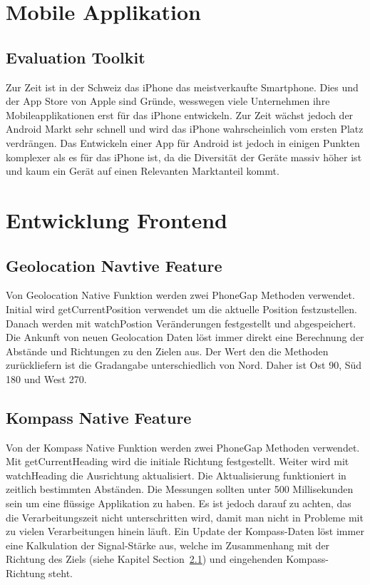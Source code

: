 
\newpage
\section{Mobile Applikation} %
\label{sec:Mobile Applikation}

\subsection{Evaluation Toolkit} %
\label{sub:Evaluation Toolkit}
Zur Zeit ist in der Schweiz das iPhone das meistverkaufte Smartphone. Dies und der App Store von Apple sind Gründe, wesswegen viele Unternehmen ihre Mobileapplikationen erst für das iPhone entwickeln. Zur Zeit wächst jedoch der Android Markt sehr schnell und wird das iPhone wahrscheinlich vom ersten Platz verdrängen. Das Entwickeln einer App für Android ist jedoch in einigen Punkten komplexer als es für das iPhone ist, da die Diversität der Geräte massiv höher ist und kaum ein Gerät auf einen Relevanten Marktanteil kommt.

\section{Entwicklung Frontend} %
\label{sec:entwicklung_frontend}

\subsection{Geolocation Navtive Feature} %
\label{sub:geolocation_native_feature}
Von Geolocation Native Funktion werden zwei PhoneGap Methoden verwendet. Initial wird getCurrentPosition verwendet um die aktuelle Position festzustellen. Danach werden mit watchPostion Veränderungen festgestellt und abgespeichert. Die Ankunft von neuen Geolocation Daten löst immer direkt eine Berechnung der Abstände und Richtungen zu den Zielen aus. Der Wert den die Methoden zurückliefern ist die Gradangabe unterschiedlich von Nord. Daher ist Ost 90, Süd 180 und West 270.

\subsection{Kompass Native Feature} %
\label{sub:kompass_native_feature}
Von der Kompass Native Funktion werden zwei PhoneGap Methoden verwendet. Mit getCurrentHeading wird die initiale Richtung festgestellt. Weiter wird mit watchHeading die Ausrichtung aktualisiert. Die Aktualisierung funktioniert in zeitlich bestimmten Abständen. Die Messungen sollten unter 500 Millisekunden sein um eine flüssige Applikation zu haben. Es ist jedoch darauf zu achten, das die Verarbeitungszeit nicht unterschritten wird, damit man nicht in Probleme mit zu vielen Verarbeitungen hinein läuft. Ein Update der Kompass-Daten löst immer eine Kalkulation der Signal-Stärke aus, welche im Zusammenhang mit der Richtung des Ziels (siehe Kapitel  Section~\ref{sub:geolocation_native_feature}) und eingehenden Kompass-Richtung steht.

